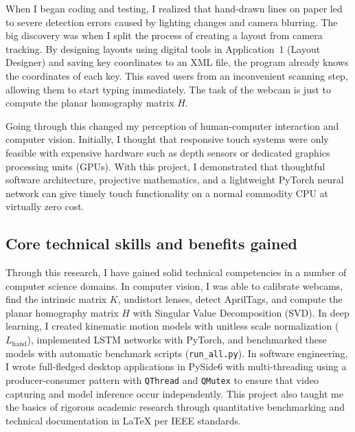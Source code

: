 When I began coding and testing, I realized that hand-drawn lines on paper led to severe detection errors caused by lighting changes and camera blurring. The big discovery was when I split the process of creating a layout from camera tracking. By designing layouts using digital tools in Application~1 (Layout Designer) and saving key coordinates to an XML file, the program already knows the coordinates of each key. This saved users from an inconvenient scanning step, allowing them to start typing immediately. The task of the webcam is just to compute the planar homography matrix $H$.

Going through this changed my perception of human-computer interaction and computer vision. Initially, I thought that responsive touch systems were only feasible with expensive hardware such as depth sensors or dedicated graphics processing units (GPUs). With this project, I demonstrated that thoughtful software architecture, projective mathematics, and a lightweight PyTorch neural network can give timely touch functionality on a normal commodity CPU at virtually zero cost.

\subsection{Core technical skills and benefits gained}
\label{subsec:concl_benefits}
Through this research, I have gained solid technical competencies in a number of computer science domains. In computer vision, I was able to calibrate webcams, find the intrinsic matrix $K$, undistort lenses, detect AprilTags, and compute the planar homography matrix $H$ with Singular Value Decomposition (SVD). In deep learning, I created kinematic motion models with unitless scale normalization ($L_{\text{hand}}$), implemented LSTM networks with PyTorch, and benchmarked these models with automatic benchmark scripts (\texttt{run\_all.py}). In software engineering, I wrote full-fledged desktop applications in PySide6 with multi-threading using a producer-consumer pattern with \texttt{QThread} and \texttt{QMutex} to ensure that video capturing and model inference occur independently. This project also taught me the basics of rigorous academic research through quantitative benchmarking and technical documentation in LaTeX per IEEE standards.

